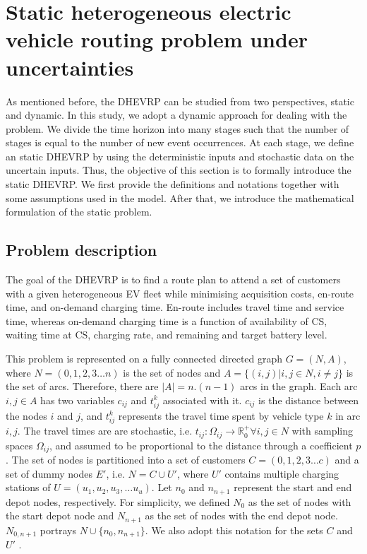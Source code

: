 \documentclass[11pt]{article}
\begin{document}
\section{Static heterogeneous electric vehicle routing problem under uncertainties}
\label{section:model}
As mentioned before, the DHEVRP can be studied from two perspectives, static and dynamic. In this study, we adopt a dynamic approach for dealing with the problem. We divide the time horizon into many stages such that the number of stages is equal to the number of new event occurrences. At each stage, we define an static DHEVRP by using the deterministic inputs and stochastic data on the uncertain inputs. Thus, the objective of this section is to formally introduce the static DHEVRP. We first provide the definitions and notations together with some assumptions used in the model. After that, we introduce the mathematical formulation of the static problem.

\subsection{Problem description}
The goal of the DHEVRP is to find a route plan to attend a set of customers with a given heterogeneous EV fleet while minimising acquisition costs, en-route time, and on-demand charging time. En-route includes travel time and service time, whereas on-demand charging time is a function of availability of CS, waiting time at CS, charging rate, and remaining and target battery level. 

This problem is represented on a fully connected directed graph $G = (N, A)$, where $N = (0,1, 2, 3 \dots n)$ is the set of nodes and $A = \{(i, j) |  i, j \in N, i \neq j \}$ is the set of arcs. Therefore, there are $|A| = n.(n-1)$ arcs in the graph. Each arc $i,j \in A$ has two variables $c_{ij}$ and $t^k_{ij}$ associated with it. $c_{ij}$ is the distance between the nodes $i$ and $j$, and $t^k_{ij}$ represents the travel time spent by vehicle type $k$ in arc $i,j$. The travel times are are stochastic, i.e. $t_{ij}:\Omega_{ij} \to \mathbb{R}_0^+ \forall i,j \in N$ with sampling spaces $\Omega_{ij}$, and assumed to be proportional to the distance through a coefficient $p$. The set of nodes is partitioned into a set of customers $C = (0,1, 2, 3 \dots c)$ and a set of dummy nodes $E'$, i.e. $N = C \cup U'$, where $U'$ contains multiple charging stations of $U = (u_1, u_2, u_3, \dots u_u)$. Let $n_0$ and $n_{n+1}$ represent the start and end depot nodes, respectively. For simplicity, we defined $N_0$ as the set of nodes with the start depot node and $N_{n+1}$ as the set of nodes with the end depot node. $N_{0, n+1}$ portrays $N \cup \{n_0, n_{n+1}\}$. We also adopt this notation for the sets $C$ and $U'$ \citep{Hiermann2016}.
\end{document}
